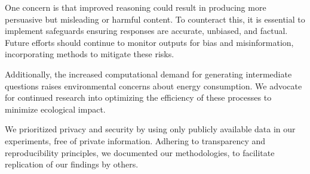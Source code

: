 One concern is that improved reasoning could result in producing more persuasive but misleading or harmful content. To counteract this, it is essential to implement safeguards ensuring responses are accurate, unbiased, and factual. Future efforts should continue to monitor outputs for bias and misinformation, incorporating methods to mitigate these risks.

Additionally, the increased computational demand for generating intermediate questions raises environmental concerns about energy consumption. We advocate for continued research into optimizing the efficiency of these processes to minimize ecological impact.

We prioritized privacy and security by using only publicly available data in our experiments, free of private information. Adhering to transparency and reproducibility principles, we documented our methodologies, to facilitate replication of our findings by others.
